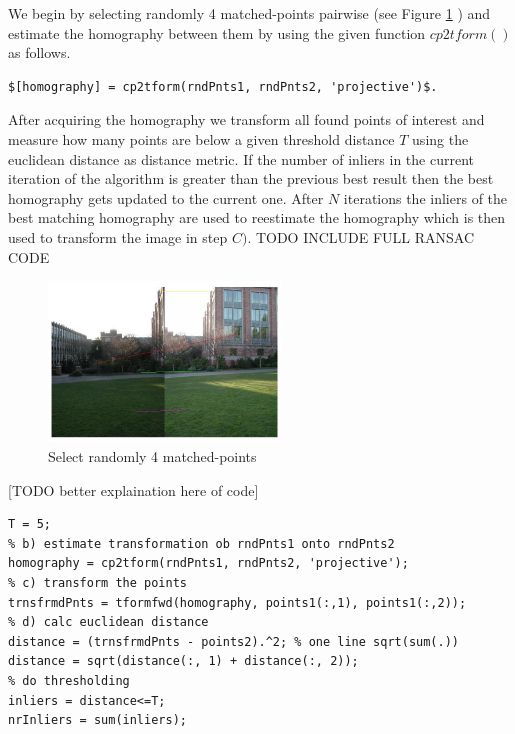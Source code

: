 \documentclass[subfigure,epsfig,fleqn,float,numbers=noenddot]{scrartcl}
\begin{document}
\par We begin by selecting randomly 4 matched-points pairwise (see Figure \ref{img:points} ) and estimate the homography between them by using the given function $cp2tform()$ as follows.
\begin{lstlisting}
$[homography] = cp2tform(rndPnts1, rndPnts2, 'projective')$. 
\end{lstlisting}
After acquiring the homography we transform all found points of interest and measure how many points are below a given threshold distance $T$ using the euclidean distance as distance metric. If the number of inliers in the current iteration of the algorithm is greater than the previous best result then the best homography gets updated to the current one. After $N$ iterations the inliers of the best matching homography are used to reestimate the homography which is then used to transform the image in step $C)$. TODO INCLUDE FULL RANSAC CODE
	\begin{figure}[H]
		\centering
		\includegraphics[width=0.55\textwidth]{./img/fourRandomMatches.jpg}
		\caption{Select randomly 4 matched-points}
		\label{img:points}
	\end{figure}
	
[TODO better explaination here of code]
\begin{lstlisting}
T = 5;
% b) estimate transformation ob rndPnts1 onto rndPnts2
homography = cp2tform(rndPnts1, rndPnts2, 'projective');
% c) transform the points 
trnsfrmdPnts = tformfwd(homography, points1(:,1), points1(:,2));
% d) calc euclidean distance
distance = (trnsfrmdPnts - points2).^2; % one line sqrt(sum(.))
distance = sqrt(distance(:, 1) + distance(:, 2));
% do thresholding
inliers = distance<=T;
nrInliers = sum(inliers);
\end{lstlisting}	
\end{document}

